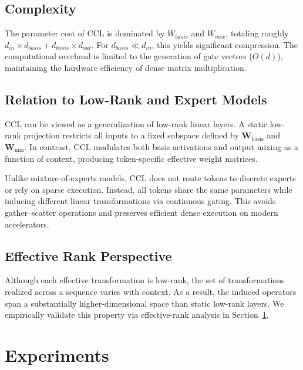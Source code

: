 \documentclass[11pt]{article}
\begin{document}
\subsection{Complexity}
The parameter cost of CCL is dominated by $W_{basis}$ and $W_{mix}$, totaling roughly $d_{in} \times d_{basis} + d_{basis} \times d_{out}$. For $d_{basis} \ll d_{in}$, this yields significant compression. The computational overhead is limited to the generation of gate vectors ($O(d)$), maintaining the hardware efficiency of dense matrix multiplication.

\subsection{Relation to Low-Rank and Expert Models}

CCL can be viewed as a generalization of low-rank linear layers. A static low-rank projection restricts all inputs to a fixed subspace defined by $\mathbf{W}_{\text{basis}}$ and $\mathbf{W}_{\text{mix}}$. In contrast, CCL modulates both basis activations and output mixing as a function of context, producing token-specific effective weight matrices.

Unlike mixture-of-experts models, CCL does not route tokens to discrete experts or rely on sparse execution. Instead, all tokens share the same parameters while inducing different linear transformations via continuous gating. This avoids gather–scatter operations and preserves efficient dense execution on modern accelerators.

\subsection{Effective Rank Perspective}

Although each effective transformation is low-rank, the set of transformations realized across a sequence varies with context. As a result, the induced operators span a substantially higher-dimensional space than static low-rank layers. We empirically validate this property via effective-rank analysis in Section~\ref{sec:experiments}.

\section{Experiments}
\label{sec:experiments}
\end{document}
